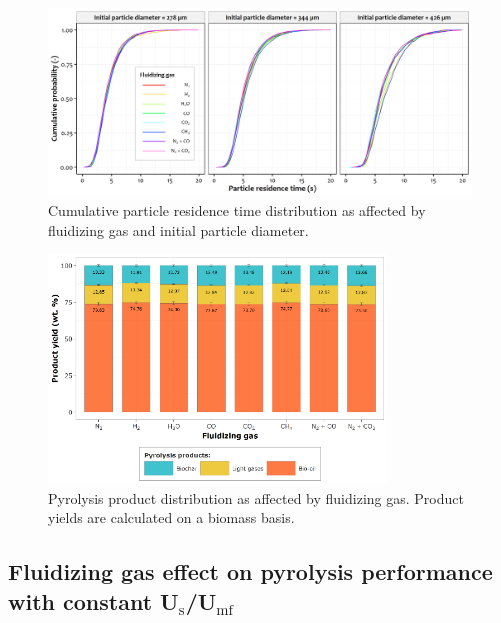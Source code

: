 \begin{figure}[H]
    \centering
    \includegraphics[width=\textwidth]{figures/cfd-particle-time.png}
    \caption{Cumulative particle residence time distribution as affected by fluidizing gas and initial particle diameter.}
    \label{fig:cfd-particle-time}
\end{figure}

\begin{figure}[H]
    \centering
    \includegraphics[width=0.8\textwidth]{figures/cfd-yields.pdf}
    \caption{Pyrolysis product distribution as affected by fluidizing gas. Product yields are calculated on a biomass basis.}
    \label{fig:cfd-yields}
\end{figure}


\subsection{Fluidizing gas effect on pyrolysis performance with constant \texorpdfstring{U$_\text{s}$/U$_\text{mf}$}{Us/Umf}}

